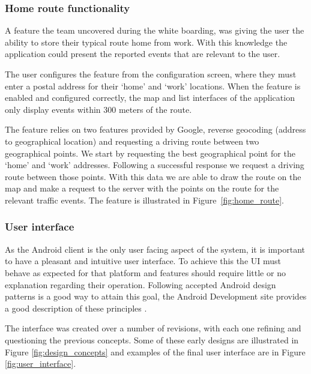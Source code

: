 \subsubsection{Home route functionality}
A feature the team uncovered during the white boarding, was giving the user the
ability to store their typical route home from work. With this knowledge the
application could present the reported events that are relevant to the user.

The user configures the feature from the configuration screen, where they must
enter a postal address for their `home' and `work' locations. When the feature
is enabled and configured correctly, the map and list interfaces of the
application only display events within 300 meters of the route.

The feature relies on two features provided by Google, reverse geocoding
(address to geographical location) and requesting a driving route between two
geographical points. We start by requesting the best geographical point for the
`home' and `work' addresses. Following a successful response we request a
driving route between those points. With this data we are able to draw the
route on the map and make a request to the server with the points on the route
for the relevant traffic events. The feature is illustrated in Figure~\ref{fig:home_route}.

\subsubsection{User interface}
As the Android client is the only user facing aspect of the system, it is
important to have a pleasant and intuitive user interface. To achieve this the
UI must behave as expected for that platform and features should require little
or no explanation regarding their operation. Following accepted Android design
patterns is a good way to attain this goal, the Android Development site
provides a good description of these principles \cite{website:android_ui}.

The interface was created over a number of revisions, with each one refining
and questioning the previous concepts. Some of these early designs are illustrated in
Figure \ref{fig:design_concepts} and examples of the final  user interface are in Figure
\ref{fig:user_interface}.
